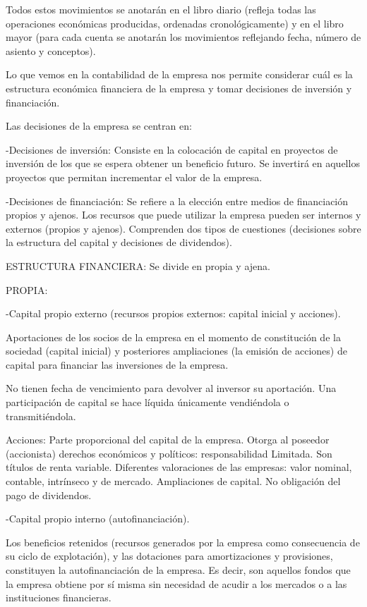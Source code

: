\documentclass[12pt, twoside, openright]{report} %
\begin{document}
Todos estos movimientos se anotarán en el libro diario (refleja todas las operaciones económicas producidas, ordenadas cronológicamente) y en el libro mayor (para cada cuenta se anotarán los movimientos reflejando fecha, número de asiento y conceptos).

Lo que vemos en la contabilidad de la empresa nos permite considerar cuál es la estructura económica financiera de la empresa y tomar decisiones de inversión y financiación.

Las decisiones de la empresa se centran en:

-Decisiones de inversión: Consiste en la colocación de capital en proyectos de inversión de los que se espera obtener un beneficio futuro. Se invertirá en aquellos proyectos que permitan incrementar el valor de la empresa.

-Decisiones de financiación: Se refiere a la elección entre medios de financiación propios y ajenos. Los recursos que puede utilizar la empresa pueden ser internos y externos (propios y ajenos). Comprenden dos tipos de cuestiones (decisiones sobre la estructura del capital y decisiones de dividendos).

ESTRUCTURA FINANCIERA: Se divide en propia y ajena.

PROPIA:

-Capital propio externo (recursos propios externos: capital inicial y acciones).

Aportaciones de los socios de la empresa en el momento de constitución de la sociedad (capital inicial) y posteriores ampliaciones (la emisión de acciones) de capital para financiar las inversiones de la empresa.

No tienen fecha de vencimiento para devolver al inversor su aportación. Una participación de capital se hace líquida únicamente vendiéndola o transmitiéndola.

Acciones: Parte proporcional del capital de la empresa. Otorga al poseedor (accionista) derechos económicos y políticos: responsabilidad Limitada. Son títulos de renta variable. Diferentes valoraciones de las empresas: valor nominal, contable, intrínseco y de mercado. Ampliaciones de capital. No obligación del pago de dividendos.

-Capital propio interno (autofinanciación).

Los beneficios retenidos (recursos generados por la empresa como consecuencia de su ciclo de explotación), y las dotaciones para amortizaciones y provisiones, constituyen la autofinanciación de la empresa. Es decir, son aquellos fondos que la empresa obtiene por sí misma sin necesidad de acudir a los mercados o a las instituciones financieras.
\end{document}
